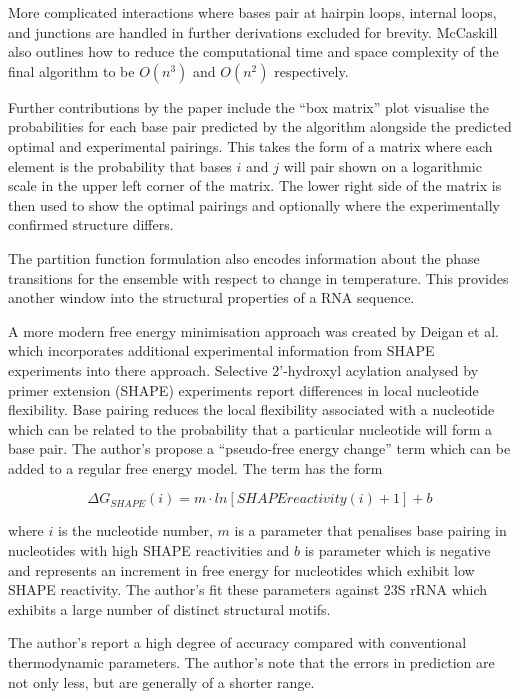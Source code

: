 \documentclass[journal]{IEEEtran}
\begin{document}
More complicated interactions where bases pair at hairpin loops, internal loops, and junctions are handled in further derivations excluded for brevity. McCaskill also outlines how to reduce the computational time and space complexity of the final algorithm to be $O(n^3)$ and $O(n^2)$ respectively.

Further contributions by the paper include the ``box matrix'' plot visualise the probabilities for each base pair predicted by the algorithm alongside the predicted optimal and experimental pairings. This takes the form of a matrix where each element is the probability that bases $i$ and $j$ will pair shown on a logarithmic scale in the upper left corner of the matrix. The lower right side of the matrix is then used to show the optimal pairings and optionally where the experimentally confirmed structure differs. 

The partition function formulation also encodes information about the phase transitions for the ensemble with respect to change in temperature. This provides another window into the structural properties of a RNA sequence.

A more modern free energy minimisation approach was created by Deigan et al. \cite{deigan2009accurate} which incorporates additional experimental information from SHAPE experiments into there approach. Selective 2'-hydroxyl acylation analysed by primer extension (SHAPE) experiments report differences in local nucleotide flexibility. Base pairing reduces the local flexibility associated with a nucleotide which can be related to the probability that a particular nucleotide will form a base pair. The author's propose a ``pseudo-free energy change'' term which can be added to a regular free energy model. The term has the form

\begin{equation}
	\Delta G_{SHAPE}(i) = m \cdot ln[SHAPEreactivity(i) + 1] + b
\end{equation}

where $i$ is the nucleotide number, $m$ is a parameter that penalises base pairing in nucleotides with high SHAPE reactivities and $b$ is parameter which is negative and represents an increment in free energy for nucleotides which exhibit low SHAPE reactivity. The author's fit these parameters against 23S rRNA which exhibits a large number of distinct structural motifs.

The author's report a high degree of accuracy compared with conventional thermodynamic parameters. The author's note that the errors in prediction are not only less, but are generally of a shorter range.
\end{document}
